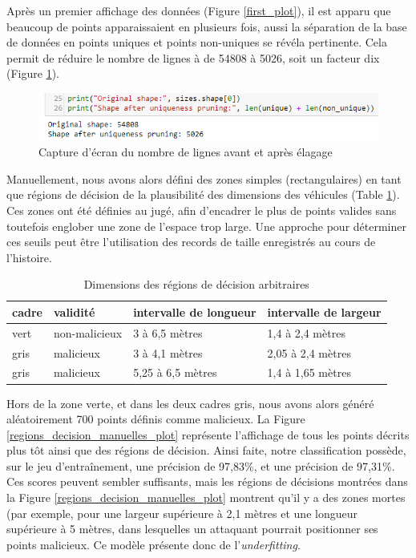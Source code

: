 \documentclass[a4paper]{report}
\begin{document}
Après un premier affichage des données (Figure \ref{first_plot}), il est apparu que beaucoup de points apparaissaient en plusieurs fois, aussi la séparation de la base de données en points uniques et points non-uniques se révéla pertinente. Cela permit de réduire le nombre de lignes à de 54808 à 5026, soit un facteur dix (Figure \ref{screen_shape}).

\begin{figure}
\centering
\includegraphics[width=\textwidth]{img/screen_shape.png}
\caption{Capture d'écran du nombre de lignes avant et après élagage\label{screen_shape}}
\end{figure}

Manuellement, nous avons alors défini des zones simples (rectangulaires) en tant que régions de décision de la plausibilité des dimensions des véhicules (Table \ref{regions_decision_manuelles_valeurs}). Ces zones ont été définies au jugé, afin d'encadrer le plus de points valides sans toutefois englober une zone de l'espace trop large. Une approche pour déterminer ces seuils peut être l'utilisation des records de taille enregistrés au cours de l'histoire.

\begin{table}
\centering
\begin{tabular}{llll}
cadre & validité & intervalle de longueur & intervalle de largeur \\
\hline
vert & non-malicieux & 3 à 6,5 mètres & 1,4 à 2,4 mètres \\
gris & malicieux & 3 à 4,1 mètres & 2,05 à 2,4 mètres \\
gris & malicieux & 5,25 à 6,5 mètres & 1,4 à 1,65 mètres \\
\end{tabular}
\caption{Dimensions des régions de décision arbitraires\label{regions_decision_manuelles_valeurs}}
\end{table}

Hors de la zone verte, et dans les deux cadres gris, nous avons alors généré aléatoirement 700 points définis comme malicieux. La Figure \ref{regions_decision_manuelles_plot} représente l'affichage de tous les points décrits plus tôt ainsi que des régions de décision. Ainsi faite, notre classification possède, sur le jeu d'entraînement, une précision de 97,83\%, et une précision de 97,31\%. Ces scores peuvent sembler suffisants, mais les régions de décisions montrées dans la Figure \ref{regions_decision_manuelles_plot} montrent qu'il y a des zones mortes (par exemple, pour une largeur supérieure à 2,1 mètres et une longueur supérieure à 5 mètres, dans lesquelles un attaquant pourrait positionner ses points malicieux. Ce modèle présente donc de l'\emph{underfitting}.
\end{document}

